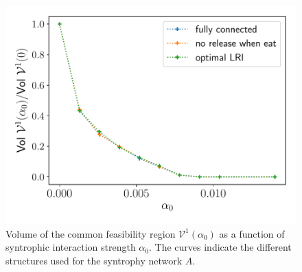 \documentclass[12pt, titlepage]{report}
\begin{document}
\begin{figure}
\centering
\includegraphics[width=0.7\linewidth]{figures/Results/measure_common_feasibility_volume_varying_syntrophy}
\caption{Volume of the common feasibility region $\mathcal{V}^1(\alpha_0)$ as a function of syntrophic interaction strength $\alpha_0$. The curves indicate the different structures used for the syntrophy network $A$.}\label{fig : feasibility results volume of cfr depending on syntrophy}
\end{figure}
\end{document}
